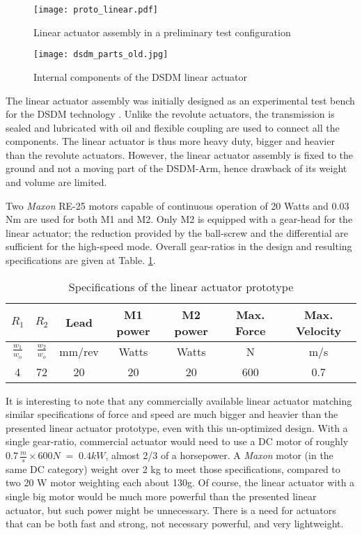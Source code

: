 \begin{figure}[htp]
	\centering
		\texttt{[image: proto\_linear.pdf]}
	\caption{Linear actuator assembly in a preliminary test configuration} 
	\label{fig:linact}
\end{figure}

\begin{figure}[htbp]
	\centering
		\texttt{[image: dsdm\_parts\_old.jpg]}
	\caption{Internal components of the DSDM linear actuator}
	\label{fig:dsdm_parts_old}
\end{figure}

The linear actuator assembly was initially designed as an experimental test bench for the DSDM technology \cite{girard_two-speed_2015}. Unlike the revolute actuators, the transmission is sealed and lubricated with oil and flexible coupling are used to connect all the components.  The linear actuator is thus more heavy duty, bigger and heavier than the revolute actuators. However, the linear actuator assembly is fixed to the ground and not a moving part of the DSDM-Arm, hence drawback of its weight and volume are limited. 

Two \textit{Maxon} RE-25 motors capable of continuous operation of 20 Watts and 0.03 Nm are used for both M1 and M2. Only M2 is equipped with a gear-head for the linear actuator; the reduction provided by the ball-screw and the differential are sufficient for the high-speed mode. Overall gear-ratios in the design and resulting specifications are given at Table. \ref{tab:specrev}.

\begin{table}[htbp]
	\centering
	\caption{Specifications of the linear actuator prototype}
		\begin{tabular}{ c c c c c c c }
			\hline
			$R_1$ & $R_2$ & Lead & M1 power & M2 power & Max. Force & Max. Velocity \\
			\hline
			$\frac{w_1}{w_o}$ & $\frac{w_2}{w_o}$ & mm/rev &Watts & Watts & N & m/s \\
			\hline \hline
			4 & 72 & 20 & 20 & 20 & 600 & 0.7 \\
			\hline
		\end{tabular}
	\label{tab:specrev}
\end{table}

It is interesting to note that any commercially available linear actuator matching similar specifications of force and speed are much bigger and heavier than the presented linear actuator prototype, even with this un-optimized design. With a single gear-ratio, commercial actuator would need to use a DC motor of roughly $0.7 \, \frac{m}{s} \times 600 N \; = \; 0.4 kW $, almost 2/3 of a horsepower. A \textit{Maxon} motor (in the same DC category) weight over 2 kg to meet those specifications, compared to two 20 W motor weighting each about 130g. Of course, the linear actuator with a single big motor would be much more powerful than the presented linear actuator, but such power might be unnecessary. There is a need for actuators that can be both fast and strong, not necessary powerful, and very lightweight. 


